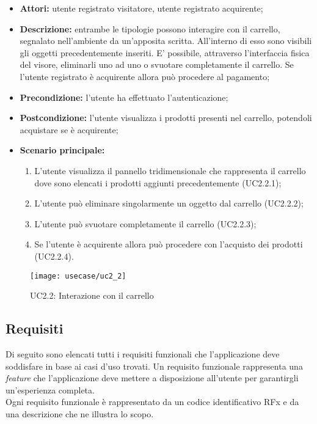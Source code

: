 \begin{itemize}
	\item \textbf{Attori:} utente registrato visitatore, utente registrato acquirente;
	\item \textbf{Descrizione:} entrambe le tipologie possono interagire con il carrello, segnalato nell'ambiente da un'apposita scritta. All'interno di esso sono visibili gli oggetti precedentemente inseriti. E' possibile, attraverso l'interfaccia fisica del visore, eliminarli uno ad uno o svuotare completamente il carrello. Se l'utente registrato è acquirente allora può procedere al pagamento;
	\item \textbf{Precondizione:} l'utente ha effettuato l'autenticazione;
	\item \textbf{Postcondizione:} l'utente visualizza i prodotti presenti nel carrello, potendoli acquistare se è acquirente;
	\item \textbf{Scenario principale:}
	\begin{enumerate}
		\item L'utente visualizza il pannello tridimensionale che rappresenta il carrello dove sono elencati i prodotti aggiunti precedentemente (UC2.2.1);
		\item L'utente può eliminare singolarmente un oggetto dal carrello (UC2.2.2);
		\item L'utente può svuotare completamente il carrello (UC2.2.3);
		\item Se l'utente è acquirente allora può procedere con l'acquisto dei prodotti (UC2.2.4).
	\end{enumerate}
\end{itemize}

\label{UC2.2}
\begin{figure}[ht]
	\begin{center}
		\texttt{[image: usecase/uc2\_2]}
		\caption{UC2.2: Interazione con il carrello}
	\end{center}
\end{figure}
\FloatBarrier

\subsection{Requisiti}

Di seguito sono elencati tutti i requisiti funzionali che l'applicazione deve soddisfare in base ai casi d'uso trovati. Un requisito funzionale rappresenta una \textit{feature} che l'applicazione deve mettere a disposizione all'utente per garantirgli un'esperienza completa. \\
Ogni requisito funzionale è rappresentato da un codice identificativo RFx e da una descrizione che ne illustra lo scopo.

